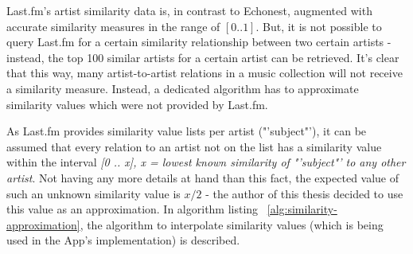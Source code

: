 Last.fm's artist similarity data is, in contrast to Echonest, augmented with accurate similarity measures in the range of $[0 .. 1]$. But, it is not possible to query Last.fm for a certain similarity relationship between two certain artists - instead, the top 100 similar artists for a certain artist can be retrieved. It's clear that this way, many artist-to-artist relations in a music collection will not receive a similarity measure. Instead, a dedicated algorithm has to approximate similarity values which were not provided by Last.fm.

As Last.fm provides similarity value lists per artist ("'subject"'), it can be assumed that every relation to an artist not on the list has a similarity value within the interval \emph{[0 .. x], x = lowest known similarity of "'subject"' to any other artist}. Not having any more details at hand than this fact, the expected value of such an unknown similarity value is $x / 2$ - the author of this thesis decided to use this value as an approximation. In algorithm listing ~\ref{alg:similarity-approximation}, the algorithm to interpolate similarity values (which is being used in the App's implementation) is described. 

